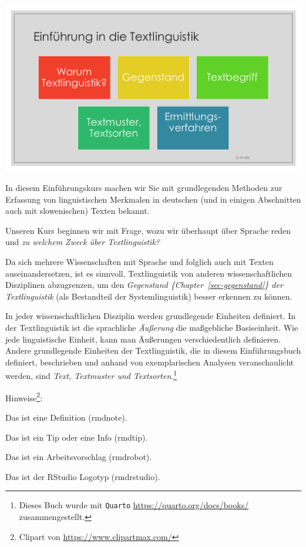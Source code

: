 \documentclass[
  letterpaper,
  DIV=11,
  numbers=noendperiod]{scrreprt}
\begin{document}
\includegraphics[width=1\textwidth,height=\textheight]{./pictures/intro_2022/Diapozitiv5.PNG}

In diesem Einführungskurs machen wir Sie mit grundlegenden Methoden zur
Erfassung von linguistischen Merkmalen in deutschen (und in einigen
Abschnitten auch mit slowenischen) Texten bekannt.

Unseren Kurs beginnen wir mit Frage, wozu wir überhaupt über Sprache
reden und \emph{zu welchem Zweck über Textlinguistik?}

Da sich mehrere Wissenschaften mit Sprache und folglich auch mit Texten
auseinandersetzen, ist es sinnvoll, Textlinguistik von anderen
wissenschaftlichen Disziplinen abzugrenzen, um den \emph{Gegenstand
\{Chapter~\ref{sec-gegenstand}\} der Textlinguistik} (als Bestandteil
der Systemlinguistik) besser erkennen zu können.

In jeder wissenschaftlichen Disziplin werden grundlegende Einheiten
definiert. In der Textlinguistik ist die sprachliche \emph{Äußerung} die
maßgebliche Basiseinheit. Wie jede linguistische Einheit, kann man
Äußerungen verschiedentlich definieren. Andere grundlegende Einheiten
der Textlinguistik, die in diesem Einführungsbuch definiert, beschrieben
und anhand von exemplarischen Analysen veranschaulicht werden, sind
\emph{Text, Textmuster und Textsorten}.\footnote{Dieses Buch wurde mit
  \texttt{Quarto} \url{https://quarto.org/docs/books/} zusammengestellt.}

Hinweise\footnote{Clipart von \url{https://www.clipartmax.com/}}:

Das ist eine Definition (rmdnote).

Das ist ein Tip oder eine Info (rmdtip).

Das ist ein Arbeitsvorschlag (rmdrobot).

Das ist der RStudio Logotyp (rmdrstudio).
\end{document}
